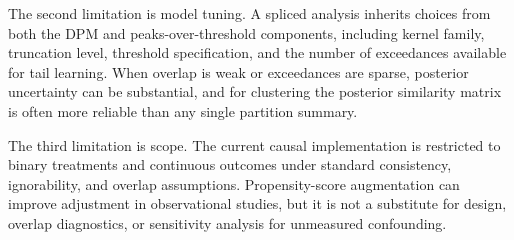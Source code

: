 \documentclass[article]{jss}\usepackage[]{graphicx}\usepackage[]{xcolor}
\begin{document}
The second limitation is model tuning. A spliced analysis inherits
choices from both the DPM and peaks-over-threshold components, including
kernel family, truncation level, threshold specification, and the number
of exceedances available for tail learning. When overlap is weak or
exceedances are sparse, posterior uncertainty can be substantial, and
for clustering the posterior similarity matrix is often more reliable
than any single partition summary.

The third limitation is scope. The current causal implementation is
restricted to binary treatments and continuous outcomes under standard
consistency, ignorability, and overlap assumptions. Propensity-score
augmentation can improve adjustment in observational studies, but it is
not a substitute for design, overlap diagnostics, or sensitivity
analysis for unmeasured confounding.





\end{document}
